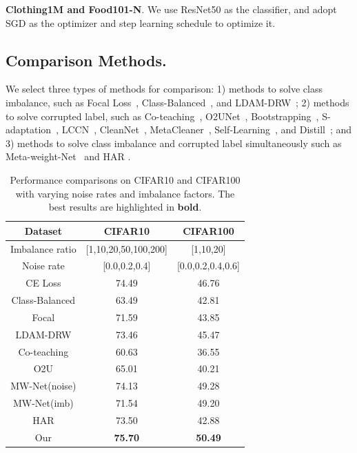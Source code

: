 \documentclass[letterpaper]{article} %
\newcommand{\bd}[1]{\textbf{#1}}
\begin{document}
\noindent\bd{Clothing1M and Food101-N}.
We use ResNet50 as the classifier, and adopt SGD as the optimizer and step learning schedule to optimize it.

\subsection{Comparison Methods.}
We select three types of methods for comparison: 1) methods to solve class imbalance, such as Focal Loss~\cite{lin2017focal}, Class-Balanced~\cite{cui2019class},  and LDAM-DRW~\cite{cao2019learning}; 2) methods to solve corrupted label, such as Co-teaching~\cite{han2018co}, O2UNet~\cite{huang2019o2u}, Bootstrapping~\cite{reed2014training}, S-adaptation~\cite{goldberger2016training}, LCCN~\cite{li2019learning}, CleanNet~\cite{lee2018cleannet}, MetaCleaner~\cite{zhang2019metacleaner}, Self-Learning~\cite{han2019deep}, and Distill~\cite{zhang2020distilling}; and 3) methods to solve class imbalance and corrupted label simultaneously such as Meta-weight-Net~\cite{shu2019meta} and HAR \cite{cao2020heteroskedastic}.


\begin{table}[t]
\begin{center}
\begin{adjustbox}{max width=0.4\textwidth}
\begin{tabular}{c|c|c}
\hline
Dataset & CIFAR10 & CIFAR100 \\
\hline
Imbalance ratio & [1,10,20,50,100,200] & [1,10,20] \\
\hline
Noise rate & [0.0,0.2,0.4] & [0.0,0.2,0.4,0.6] \\
\hline
\hline
CE Loss  & 74.49 & 46.76 \\
\hline
\hline
Class-Balanced & 63.49 & 42.81 \\
\hline
Focal & 71.59 & 43.85 \\
\hline
LDAM-DRW & 73.46 & 45.47  \\
\hline
\hline
Co-teaching & 60.63 & 36.55   \\
\hline
O2U & 65.01 & 40.21  \\
\hline
\hline
MW-Net(noise) & 74.13 & 49.28  \\
MW-Net(imb) & 71.54 & 49.20 \\
HAR& 73.50 & 42.88 \\
\hline
\hline
Our & \bd{75.70} & \bd{50.49}  \\
\hline
\end{tabular}
\end{adjustbox}
\caption{Performance comparisons on CIFAR10 and CIFAR100 with varying noise rates and imbalance factors.
The best results are highlighted in \bd{bold}.}
\label{tab:cifar10_res}
\end{center}
\end{table}
\end{document}

